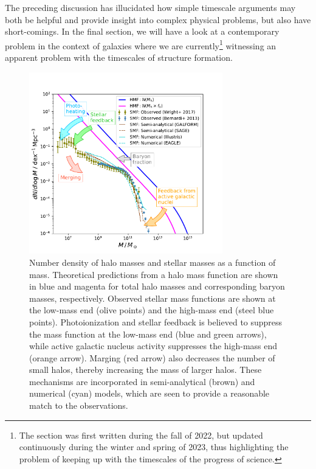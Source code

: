 \documentclass[useAMS]{aa}
\begin{document}
The preceding discussion has illucidated how simple timescale arguments may both be helpful and provide insight into complex physical problems, but also have short-comings. In the final section, we will have a look at a contemporary problem in the context of galaxies where we are currently\footnote{The section was first written during the fall of 2022, but updated continuously during the winter and spring of 2023, thus highlighting the problem of keeping up with the timescales of the progress of science.} witnessing an apparent problem with the timescales of structure formation.

\begin{figure}[!t]
    \centering
    \includegraphics [width=0.75\textwidth] {hmf2smf.pdf}
    \caption{Number density of halo masses and stellar masses as a function of mass.
    Theoretical predictions from a halo mass function are shown in blue and magenta for total halo masses and corresponding baryon masses, respectively.
    Observed stellar mass functions are shown at the low-mass end (olive points) and the high-mass end (steel blue points).
    Photoionization and stellar feedback is believed to suppress the mass function at the low-mass end (blue and green arrows), while active galactic nucleus activity suppresses the high-mass end (orange arrow).
    Marging (red arrow) also decreases the number of small halos, thereby increasing the mass of larger halos.
    These mechanisms are incorporated in semi-analytical (brown) and numerical (cyan) models, which are seen to provide a reasonable match to the observations.}
    \label{fig:hmf2smf}
\end{figure}
\end{document}
